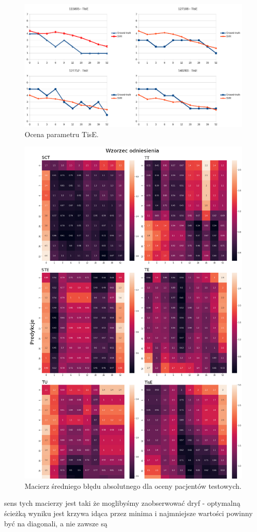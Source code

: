 \begin{figure}[h]
	\centering
	\includegraphics[width=1\textwidth]{figures/TisE.png}
	\caption{Ocena parametru TisE.}\label{fig:TisE}
\end{figure}

\begin{figure}[t!]
	\centering
	\includegraphics[width=1\textwidth]{figures/cm.png}
	\caption{Macierz średniego błędu absolutnego dla oceny pacjentów testowych.}\label{fig:TisE}
\end{figure}
sens tych macierzy jest taki że moglibyśmy zaobserwować dryf - optymalną ścieżką wyniku jest krzywa idąca przez minima i najmniejsze wartości powinny być na diagonali, a nie zawsze są

